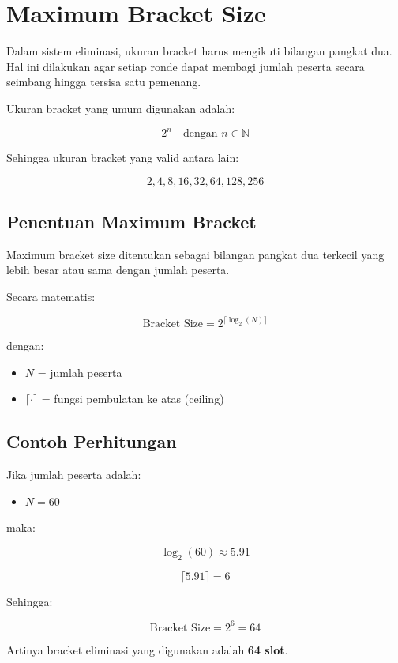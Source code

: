 \section{Maximum Bracket Size}

Dalam sistem eliminasi, ukuran bracket harus mengikuti bilangan pangkat dua. 
Hal ini dilakukan agar setiap ronde dapat membagi jumlah peserta secara seimbang hingga tersisa satu pemenang.

Ukuran bracket yang umum digunakan adalah:

\[
2^n \quad \text{dengan } n \in \mathbb{N}
\]

Sehingga ukuran bracket yang valid antara lain:

\[
2, 4, 8, 16, 32, 64, 128, 256
\]

\subsection{Penentuan Maximum Bracket}

Maximum bracket size ditentukan sebagai bilangan pangkat dua terkecil yang lebih besar atau sama dengan jumlah peserta.

Secara matematis:

\[
\text{Bracket Size} = 2^{\lceil \log_2(N) \rceil}
\]

dengan:

\begin{itemize}
\item $N$ = jumlah peserta
\item $\lceil \cdot \rceil$ = fungsi pembulatan ke atas (ceiling)
\end{itemize}

\subsection{Contoh Perhitungan}

Jika jumlah peserta adalah:

\begin{itemize}
\item $N = 60$
\end{itemize}

maka:

\[
\log_2(60) \approx 5.91
\]

\[
\lceil 5.91 \rceil = 6
\]

Sehingga:

\[
\text{Bracket Size} = 2^6 = 64
\]

Artinya bracket eliminasi yang digunakan adalah \textbf{64 slot}.

